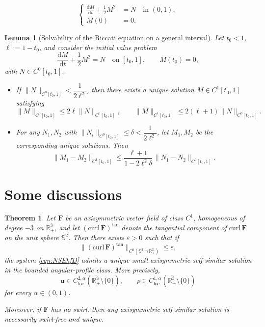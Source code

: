 \documentclass[10pt,a4paper]{amsart}
\newtheorem{theorem}{Theorem}
\newtheorem{lemma}{Lemma}
\newcommand{\BF}{{\boldsymbol{F}}}
\newcommand{\Bu}{{\boldsymbol{u}}}
\newcommand{\curl}{\mathrm{curl}}
\begin{document}
\begin{equation}\label{eqn:Riccati}
\left\{
\begin{aligned}
\frac{\mathrm{d} M}{\mathrm{d} t} + \frac12 M^2 &= N \quad \text{in } (0,1), \\
M(0)&=0.
\end{aligned}
\right.
\end{equation}

\begin{lemma}[Solvability of the Riccati equation on a general interval]\label{lm:Riccati}
Let $t_0<1$, $\ell:=1-t_0$, and consider the initial value problem
\[
\frac{\mathrm{d}M}{\mathrm{d}t} + \frac12 M^{2} = N \quad \text{on } [t_0,1],\qquad M(t_0)=0,
\]
with $N\in C^{0}[t_0,1]$.
\begin{itemize}
\item[(i)] If $\|N\|_{C^{0}[t_0,1]} < \dfrac{1}{2\ell^{2}}$, then there exists a unique solution $M\in C^{1}[t_0,1]$ satisfying
\[
\|M\|_{C^{0}[t_0,1]} \le 2\ell\|N\|_{C^{0}[t_0,1]},\qquad
\|M\|_{C^{1}[t_0,1]} \le 2(\ell+1)\|N\|_{C^{0}[t_0,1]}.
\]
\item[(ii)] For any $N_{1},N_{2}$ with $\|N_{i}\|_{C^{0}[t_0,1]} \le \delta < \dfrac{1}{2\ell^{2}}$, let $M_{1},M_{2}$ be the corresponding unique solutions. Then
\[
\|M_{1}-M_{2}\|_{C^{1}[t_0,1]} \le \frac{\ell+1}{1-2\ell^{2}\delta}\,\|N_{1}-N_{2}\|_{C^{0}[t_0,1]}.
\]
\end{itemize}
\end{lemma}

\section{Some discussions}\label{sec:Discussions}

\begin{theorem}\label{thm:A}
Let $\BF$ be an axisymmetric vector field of class $C^1$, homogeneous of degree $-3$ on $\mathbb{R}^3_+$, and let $(\curl\,\BF)^{\tan}$ denote the tangential component of $\curl\,\BF$ on the unit sphere $\mathbb{S}^2$.
Then there exists $\varepsilon>0$ such that if
\[
\|(\curl\,\BF)^{\tan}\|_{C^0(\mathbb{S}^2\cap\mathbb{R}^3_+)} \le \varepsilon,
\]
the system \eqref{eqn:NSEhfD} admits a unique \emph{small axisymmetric self-similar solution in the bounded angular-profile class}. More precisely,
\[
\Bu\in C^{2,\alpha}_{\mathrm{loc}}(\overline{\mathbb R^3_+}\setminus\{0\}),
\qquad p\in C^{1,\alpha}_{\mathrm{loc}}(\overline{\mathbb R^3_+}\setminus\{0\})
\]
for every $\alpha\in(0,1)$.

Moreover, if $\BF$ has no swirl, then any axisymmetric self-similar solution is necessarily swirl-free and unique.
\end{theorem}
\end{document}
